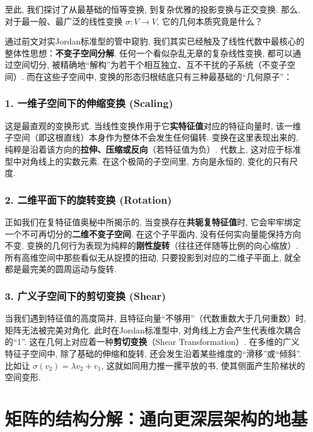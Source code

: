 \documentclass{ctexart}
\begin{document}
至此, 我们探讨了从最基础的恒等变换, 到复杂优雅的投影变换与正交变换. 那么, 对于最一般、最广泛的线性变换 $\sigma: V \to V$, 它的几何本质究竟是什么？

通过前文对实Jordan标准型的管中窥豹, 我们其实已经触及了线性代数中最核心的整体性思想：\textbf{不变子空间分解}. 任何一个看似杂乱无章的复杂线性变换, 都可以通过空间切分, 被精确地“解构”为若干个相互独立、互不干扰的子系统（不变子空间）. 而在这些子空间中, 变换的形态归根结底只有三种最基础的“几何原子”：

\subsubsection{1. 一维子空间下的伸缩变换 (Scaling)}

这是最直观的变换形式. 当线性变换作用于它\textbf{实特征值}对应的特征向量时, 该一维子空间（即这根直线）本身作为整体不会发生任何偏转. 变换在这里表现出来的, 纯粹是沿着该方向的\textbf{拉伸、压缩或反向}（若特征值为负）. 
代数上, 这对应于标准型中对角线上的实数元素. 在这个极简的子空间里, 方向是永恒的, 变化的只有尺度.

\subsubsection{2. 二维平面下的旋转变换 (Rotation)}

正如我们在复特征值奥秘中所揭示的, 当变换存在\textbf{共轭复特征值}时, 它会牢牢绑定一个不可再切分的\textbf{二维不变子空间}. 
在这个子平面内, 没有任何实向量能保持方向不变. 变换的几何行为表现为纯粹的\textbf{刚性旋转}（往往还伴随等比例的向心缩放）. 所有高维空间中那些看似无从捉摸的扭动, 只要投影到对应的二维子平面上, 就全都是最完美的圆周运动与旋转.

\subsubsection{3. 广义子空间下的剪切变换 (Shear)}

当我们遇到特征值的高度简并, 且特征向量“不够用”（代数重数大于几何重数）时, 矩阵无法被完美对角化. 此时在Jordan标准型中, 对角线上方会产生代表维次耦合的“1”. 
这在几何上对应着一种\textbf{剪切变换}（Shear Transformation）. 在多维的广义特征子空间中, 除了基础的伸缩和旋转, 还会发生沿着某些维度的“滑移”或“倾斜”. 比如让 $\sigma(v_2) = \lambda v_2 + v_1$, 这就如同用力推一摞平放的书, 使其侧面产生阶梯状的空间变形.


\section{矩阵的结构分解：通向更深层架构的地基}
\end{document}
